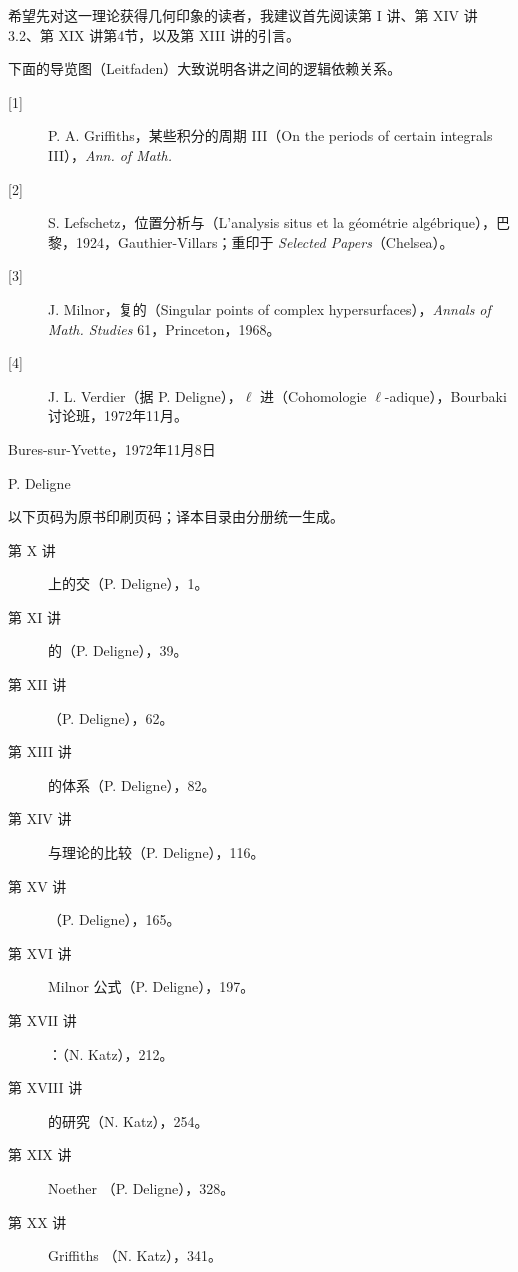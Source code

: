 希望先对这一理论获得几何印象的读者，我建议首先阅读第 I 讲、第 XIV 讲 3.2、第 XIX 讲第4节，以及第 XIII 讲的引言。

下面的导览图（Leitfaden）大致说明各讲之间的逻辑依赖关系。
\begin{description}
\item[{[1]}] P. A. Griffiths，某些积分的周期 III（On the periods of certain integrals III），\textit{Ann. of Math.}
\item[{[2]}] S. Lefschetz，位置分析与（L'analysis situs et la géométrie algébrique），巴黎，1924，Gauthier-Villars；重印于 \textit{Selected Papers}（Chelsea）。
\item[{[3]}] J. Milnor，复的（Singular points of complex hypersurfaces），\textit{Annals of Math. Studies} 61，Princeton，1968。
\item[{[4]}] J. L. Verdier（据 P. Deligne），$\ell$ 进（Cohomologie $\ell$-adique），Bourbaki 讨论班，1972年11月。
\end{description}
\begin{flushright}Bures-sur-Yvette，1972年11月8日\par P. Deligne\end{flushright}
以下页码为原书印刷页码；译本目录由分册统一生成。
\begin{description}
\item[第 X 讲] 上的交（P. Deligne），1。
\item[第 XI 讲] 的（P. Deligne），39。
\item[第 XII 讲] （P. Deligne），62。
\item[第 XIII 讲] 的体系（P. Deligne），82。
\item[第 XIV 讲] 与理论的比较（P. Deligne），116。
\item[第 XV 讲] （P. Deligne），165。
\item[第 XVI 讲] Milnor 公式（P. Deligne），197。
\item[第 XVII 讲] ：（N. Katz），212。
\item[第 XVIII 讲] 的研究（N. Katz），254。
\item[第 XIX 讲] Noether （P. Deligne），328。
\item[第 XX 讲] Griffiths （N. Katz），341。
\end{description}
